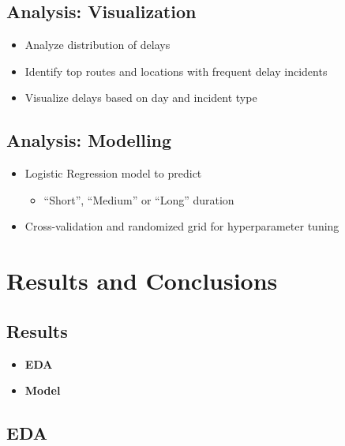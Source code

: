 \documentclass[
  letterpaper,
  DIV=11,
  numbers=noendperiod]{scrartcl}
\providecommand{\tightlist}{%
  \setlength{\itemsep}{0pt}\setlength{\parskip}{0pt}}\usepackage{longtable,booktabs,array}
\begin{document}
\subsection{Analysis: Visualization}\label{analysis-visualization}

\begin{itemize}
\tightlist
\item
  Analyze distribution of delays
\item
  Identify top routes and locations with frequent delay incidents
\item
  Visualize delays based on day and incident type
\end{itemize}

\subsection{Analysis: Modelling}\label{analysis-modelling}

\begin{itemize}
\tightlist
\item
  Logistic Regression model to predict

  \begin{itemize}
  \tightlist
  \item
    ``Short'', ``Medium'' or ``Long'' duration
  \end{itemize}
\item
  Cross-validation and randomized grid for hyperparameter tuning
\end{itemize}

\section{Results and Conclusions}\label{results-and-conclusions}

\subsection{Results}\label{results}

\begin{itemize}
\tightlist
\item
  \textbf{EDA}
\item
  \textbf{Model}
\end{itemize}

\subsection{EDA}\label{eda}
\end{document}
